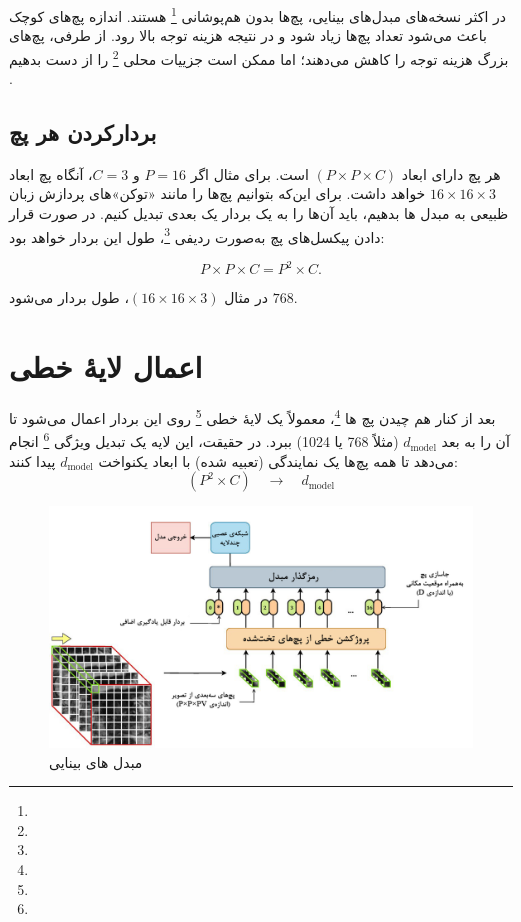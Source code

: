در اکثر نسخه‌های مبدل‌های بینایی، پچ‌ها بدون هم‌پوشانی \footnote{} هستند. اندازه پچ‌های کوچک باعث می‌شود تعداد پچ‌ها زیاد شود و در نتیجه هزینه توجه بالا رود. از طرفی، پچ‌های بزرگ هزینه توجه را کاهش می‌دهند؛ اما ممکن است جزییات محلی \footnote{} را از دست بدهیم \cite{dosovitskiy2020image}.


\subsection{بردارکردن هر پچ}
هر پچ دارای ابعاد \((P \times P \times C)\) است. برای مثال اگر \(P=16\) و \(C=3\)، آنگاه پچ ابعاد \(16 \times 16 \times 3\) خواهد داشت.  
برای این‌که بتوانیم پچ‌ها را مانند «توکن»‌های پردازش زبان ظبیعی به مبدل ها بدهیم، باید آن‌ها را به یک بردار یک ‌بعدی تبدیل کنیم. در صورت قرار دادن پیکسل‌های پچ به‌صورت ردیفی \footnote{}، طول این بردار خواهد بود:

\begin{equation}
	P \times P \times C = P^2 \times C.
	\label{eq:patch_volume}
\end{equation}

در مثال \((16 \times 16 \times 3)\)، طول بردار می‌شود \(768\).


\section{اعمال لایهٔ خطی}
بعد از کنار هم چیدن پچ ها \footnote{}، معمولاً یک لایهٔ خطی \footnote{} روی این بردار اعمال می‌شود تا آن را به بعد \(d_{\text{model}}\) (مثلاً 768 یا 1024) ببرد. در حقیقت، این لایه یک تبدیل ویژگی \footnote{} انجام می‌دهد تا همه پچ‌ها یک نمایندگی (تعبیه شده) با ابعاد یکنواخت \(d_{\text{model}}\) پیدا کنند:
\[
(P^2 \times C) \quad \rightarrow \quad d_{\text{model}}
\]

\begin{figure}[h]
	\centering
	\begin{minipage}[b]{0.9\textwidth}
		\centering
		\includegraphics[width=\textwidth]{transformer_images/persian images/b07.png}
		\caption{مبدل های بینایی}
		\label{fig:Embedding Vision Transformer}
	\end{minipage}
	\hfill
\end{figure}

